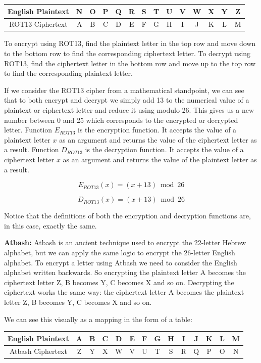 \begin{center}
  \begin{tabular}{|c|c|c|c|c|c|c|c|c|c|c|c|c|c|}
  \hline
    English Plaintext & N & O & P & Q & R & S & T & U & V & W & X & Y & Z \\ \hline
	ROT13 Ciphertext & A & B & C & D & E & F & G & H & I & J & K & L & M \\ \hline
  \end{tabular}
\end{center}

\normalsize

To encrypt using ROT13, find the plaintext letter in the top row and move down to the bottom row to find the corresponding ciphertext letter. To decrypt using ROT13, find the ciphertext letter in the bottom row and move up to the top row to find the corresponding plaintext letter.

If we consider the ROT13 cipher from a mathematical standpoint, we can see that to both encrypt and decrypt we simply add 13 to the numerical value of a plaintext or ciphertext letter and reduce it using modulo 26. This gives us a new number between 0 and 25 which corresponds to the encrypted or decrypted letter. Function $E_{ROT13}$ is the encryption function. It accepts the value of a plaintext letter $x$ as an argument and returns the value of the ciphertext letter as a result. Function $D_{ROT13}$ is the decryption function. It accepts the value of a ciphertext letter $x$ as an argument and returns the value of the plaintext letter as a result.

\[
  E_{ROT13}(x) = (x + 13) \bmod 26
\]

\[
  D_{ROT13}(x) = (x + 13) \bmod 26
\]

Notice that the definitions of both the encryption and decryption functions are, in this case, exactly the same.

{\bf Atbash:} Atbash is an ancient technique used to encrypt the 22-letter Hebrew alphabet, but we can apply the same logic to encrypt the 26-letter English alphabet. To encrypt a letter using Atbash we need to consider the English alphabet written backwards. So encrypting the plaintext letter A becomes the ciphertext letter Z, B becomes Y, C becomes X and so on. Decrypting the ciphertext works the same way: the ciphertext letter A becomes the plaintext letter Z, B becomes Y, C becomes X and so on.

We can see this visually as a mapping in the form of a table:

\Large
\begin{center}
  \begin{tabular}{|c|c|c|c|c|c|c|c|c|c|c|c|c|c|}
  \hline
    English Plaintext & A & B & C & D & E & F & G & H & I & J & K & L & M \\ \hline
	Atbash Ciphertext & Z & Y & X & W & V & U & T & S & R & Q & P & O & N \\ \hline
  \end{tabular}
\end{center}

